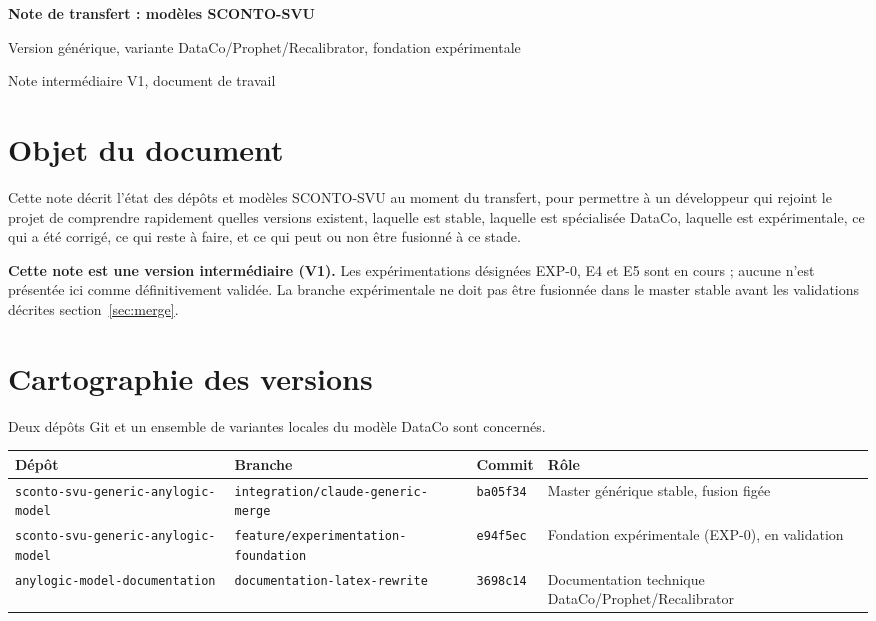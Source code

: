 \documentclass[11pt,a4paper]{article}
\newcommand{\code}[1]{\texttt{#1}}
\begin{document}
\begin{center}
{\Large\bfseries\color{cpblue} Note de transfert : modèles SCONTO-SVU\par}
\vspace{0.2cm}
{\normalsize Version générique, variante DataCo/Prophet/Recalibrator, fondation expérimentale\par}
\vspace{0.15cm}
{\small Note intermédiaire V1, document de travail\par}
\end{center}
\vspace{0.3cm}

\section{Objet du document}

Cette note décrit l'état des dépôts et modèles SCONTO-SVU au moment du
transfert, pour permettre à un développeur qui rejoint le projet de
comprendre rapidement quelles versions existent, laquelle est stable,
laquelle est spécialisée DataCo, laquelle est expérimentale, ce qui a été
corrigé, ce qui reste à faire, et ce qui peut ou non être fusionné à ce
stade.

\textbf{Cette note est une version intermédiaire (V1).} Les expérimentations
désignées EXP-0, E4 et E5 sont en cours ; aucune n'est présentée ici comme
définitivement validée. La branche expérimentale ne doit pas être fusionnée
dans le master stable avant les validations décrites section~\ref{sec:merge}.

\section{Cartographie des versions}
\label{sec:cartographie}

Deux dépôts Git et un ensemble de variantes locales du modèle DataCo sont
concernés.

\begin{center}
\small
\begin{tabularx}{\textwidth}{p{3.0cm}p{3.4cm}p{1.5cm}X}
\toprule
Dépôt & Branche & Commit & Rôle \\
\midrule
\code{sconto-svu-\allowbreak generic-\allowbreak anylogic-model} & \code{integration/\allowbreak claude-\allowbreak generic-merge} & \code{ba05f34} & Master générique stable, fusion figée \\
\code{sconto-svu-\allowbreak generic-\allowbreak anylogic-model} & \code{feature/\allowbreak experimentation-\allowbreak foundation} & \code{e94f5ec} & Fondation expérimentale (EXP-0), en validation \\
\code{anylogic-\allowbreak model-\allowbreak documentation} & \code{documentation-\allowbreak latex-\allowbreak rewrite} & \code{3698c14} & Documentation technique DataCo/Prophet/Recalibrator \\
\bottomrule
\end{tabularx}
\end{center}
\end{document}
